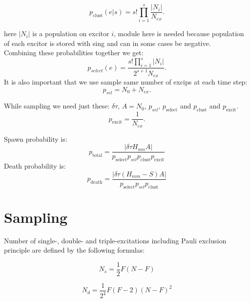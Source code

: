 \documentclass[twoside,english]{uiofysmaster}
\theoremstyle{definition}
\begin{document}
\begin{equation}
p_{\text{clust}} (e|s)= s! \prod_{i=1}^s \frac{|N_i|}{N_{ex}}.
\end{equation}

here $|N_i|$ is a population on excitor $i$, module here is needed because population of each excitor is stored with sing and can in some cases be negative.\\
Combining these probabilities together we get:
\begin{equation}
p_{select}(e)= \frac{s!\prod_{i=1}^{s} |N_i|}{2^{s+1}N_{ex}}.
\end{equation}
It is also important that we use sample same number of excips at each time step:
\begin{equation}
p_{sel}= N_0+N_{ex}.
\end{equation}

While sampling we need just these: $\delta \tau$, $A=N_0$, $p_{sel}$, $p_{\text{select}}$ and $p_{\text{clust}}$ and $p_{\text{excit}}$.
\begin{equation}
p_{\text{excit}} = \frac{1}{N_{ex}}. 
\end{equation}

Spawn probability is:
\begin{equation}
p_{\text{total}} = \frac{|\delta \tau H_{nm}A|}{p_{\text{select}}p_{sel}p_{\text{clust}}p_{\text{excit}}} 
\end{equation} 
Death probability is: 
\begin{equation}
p_{\text{death}} = \frac{|\delta \tau (H_{mm} - S)A|}{p_{\text{select}}p_{sel}p_{\text{clust}}} 
\end{equation}




\section{Sampling}

Number of single-, double- and triple-excitations including Pauli exclusion principle are defined by the following formulas:

\begin{equation}\label{eq:num_singles}
N_s = \frac{1}{2}F(N-F)
\end{equation}

\begin{equation}\label{eq:num_doubles}
N_d = \frac{1}{2^4}F(F-2)(N-F)^2
\end{equation}
\end{document}
